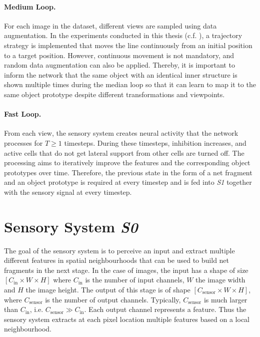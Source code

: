 \paragraph{Medium Loop.} For each image in the dataset, different views are sampled using data augmentation. In the experiments conducted in this thesis (c.f. ), a trajectory strategy is implemented that moves the line continuously from an initial position to a target position.
However, continuous movement is not mandatory, and random data augmentation can also be applied. Thereby, it is important to inform the network that the same object with an identical inner structure is shown multiple times during the median loop so that it can learn to map it to the same object prototype despite different transformations and viewpoints.

\paragraph{Fast Loop.} From each view, the sensory system creates neural activity that the network processes for $T \geq 1$ timesteps. During these timesteps, inhibition increases, and active cells that do not get lateral support from other cells are turned off. 
The processing aims to iteratively improve the features and the corresponding object prototypes over time. Therefore, the previous state in the form of a net fragment and an object prototype is required at every timestep and is fed into \emph{S1} together with the sensory signal at every timestep.


\section{Sensory System \emph{S0}}
The goal of the sensory system is to perceive an input and extract multiple different features in spatial neighbourhoods that can be used to build net fragments  in the next stage.
In the case of images, the input has a shape of size $[C_{\text{in}} \times W \times H]$ where $C_{\text{in}}$ is the number of input channels, $W$ the image width and $H$ the image height.
The output of this stage is of shape $[C_{\text{sensor}} \times W \times H]$, where $C_{\text{sensor}}$ is the number of output channels. Typically, $C_{\text{sensor}}$ is much larger than $C_{\text{in}}$, i.e. $C_{\text{sensor}} \gg C_{\text{in}}$.
Each output channel represents a feature. Thus the sensory system extracts at each pixel location multiple features based on a local neighbourhood.

